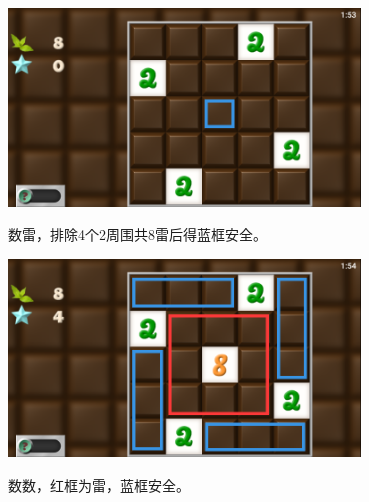 \subsection{} %
\begin{center}
    \includegraphics[width=0.7\textwidth]{puzzle/49-1.png}
\end{center}
数雷，排除4个2周围共8雷后得蓝框安全。
\begin{center}
    \includegraphics[width=0.7\textwidth]{puzzle/49-2.png}
\end{center}
数数，红框为雷，蓝框安全。

